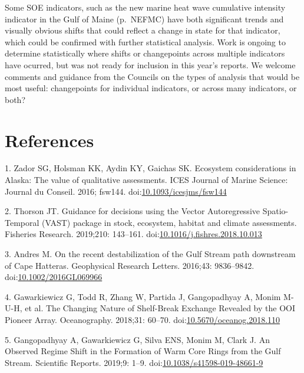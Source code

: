 \documentclass[
  10pt,
]{article}
\begin{document}
Some SOE indicators, such as the new marine heat wave cumulative
intensity indicator in the Gulf of Maine (p.~NEFMC) have both
significant trends and visually obvious shifts that could reflect a
change in state for that indicator, which could be confirmed with
further statistical analysis. Work is ongoing to determine statistically
where shifts or changepoints across multiple indicators have ocurred,
but was not ready for inclusion in this year's reports. We welcome
comments and guidance from the Councils on the types of analysis that
would be most useful: changepoints for individual indicators, or across
many indicators, or both?

\hypertarget{references}{%
\section*{References}\label{references}}

\hypertarget{refs}{}
\leavevmode\hypertarget{ref-zador_ecosystem_2016}{}%
1. Zador SG, Holsman KK, Aydin KY, Gaichas SK. Ecosystem considerations
in Alaska: The value of qualitative assessments. ICES Journal of Marine
Science: Journal du Conseil. 2016; fsw144.
doi:\href{https://doi.org/10.1093/icesjms/fsw144}{10.1093/icesjms/fsw144}

\leavevmode\hypertarget{ref-thorson_guidance_2019}{}%
2. Thorson JT. Guidance for decisions using the Vector Autoregressive
Spatio-Temporal (VAST) package in stock, ecosystem, habitat and climate
assessments. Fisheries Research. 2019;210: 143--161.
doi:\href{https://doi.org/10.1016/j.fishres.2018.10.013}{10.1016/j.fishres.2018.10.013}

\leavevmode\hypertarget{ref-andres_recent_2016}{}%
3. Andres M. On the recent destabilization of the Gulf Stream path
downstream of Cape Hatteras. Geophysical Research Letters. 2016;43:
9836--9842.
doi:\href{https://doi.org/10.1002/2016GL069966}{10.1002/2016GL069966}

\leavevmode\hypertarget{ref-gawarkiewicz_changing_2018}{}%
4. Gawarkiewicz G, Todd R, Zhang W, Partida J, Gangopadhyay A, Monim
M-U-H, et al. The Changing Nature of Shelf-Break Exchange Revealed by
the OOI Pioneer Array. Oceanography. 2018;31: 60--70.
doi:\href{https://doi.org/10.5670/oceanog.2018.110}{10.5670/oceanog.2018.110}

\leavevmode\hypertarget{ref-gangopadhyay_observed_2019}{}%
5. Gangopadhyay A, Gawarkiewicz G, Silva ENS, Monim M, Clark J. An
Observed Regime Shift in the Formation of Warm Core Rings from the Gulf
Stream. Scientific Reports. 2019;9: 1--9.
doi:\href{https://doi.org/10.1038/s41598-019-48661-9}{10.1038/s41598-019-48661-9}
\end{document}
